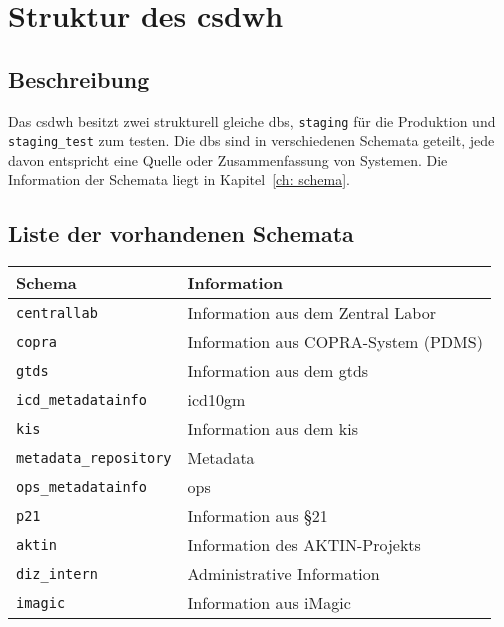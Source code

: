  \chapter{Struktur des \acs{csdwh}} \label{ch:strcsdwh} 
 
    \section{Beschreibung}
    
    Das \ac{csdwh} besitzt zwei strukturell gleiche \acp{db}, \texttt{staging} für die Produktion und \texttt{staging\_test} zum testen. Die \acp{db} sind in verschiedenen Schemata geteilt, jede davon entspricht eine Quelle oder Zusammenfassung von Systemen. Die Information der Schemata liegt in Kapitel~\ref{ch: schema}.
    
    \section{Liste der vorhandenen Schemata}
    
    \begin{center}
    	\begin{tabular}{|| l | p{8cm} ||} 
    		\hline
    		Schema & Information \\ 
    		\hline\hline
    		\texttt{centrallab} & Information aus dem Zentral Labor \\ 
    		\hline
    		\texttt{copra} & Information aus COPRA-System (PDMS) \\
    		\hline
    		\texttt{gtds} & Information aus dem \ac{gtds}  \\
    		\hline
    		\texttt{icd\_metadatainfo} & \ac{icd10gm}  \\
    		\hline
    		\texttt{kis} & Information aus dem \ac{kis}  \\
    		\hline
        	\texttt{metadata\_repository} & Metadata \\
        	\hline 
        	\texttt{ops\_metadatainfo} & \ac{ops}  \\
        	\hline
        	\texttt{p21} & Information aus \S 21  \\ 
        	\hline
        	\texttt{aktin} & Information des AKTIN-Projekts\\
        	\hline
        	\texttt{diz\_intern} & Administrative Information\\
        	\hline
        	\texttt{imagic} & Information aus iMagic \\
        	\hline
    	\end{tabular}
    \end{center}